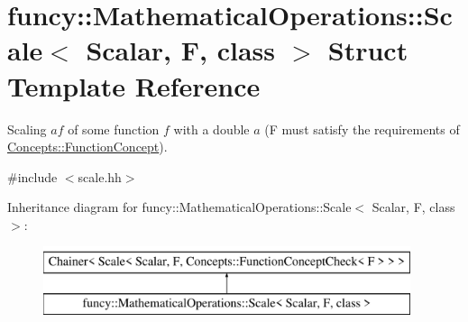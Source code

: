 \hypertarget{structfuncy_1_1MathematicalOperations_1_1Scale}{\section{funcy\-:\-:Mathematical\-Operations\-:\-:Scale$<$ Scalar, F, class $>$ Struct Template Reference}
\label{structfuncy_1_1MathematicalOperations_1_1Scale}
}


Scaling $ af $ of some function $ f $ with a double $ a $ (F must satisfy the requirements of \hyperlink{structfuncy_1_1Concepts_1_1FunctionConcept}{Concepts\-::\-Function\-Concept}).  




{\ttfamily \#include $<$scale.\-hh$>$}

Inheritance diagram for funcy\-:\-:Mathematical\-Operations\-:\-:Scale$<$ Scalar, F, class $>$\-:\begin{figure}[H]
\begin{center}
\leavevmode
\includegraphics[height=2.000000cm]{structfuncy_1_1MathematicalOperations_1_1Scale}
\end{center}
\end{figure}
